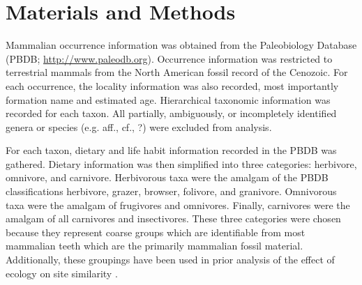 \documentclass[12pt,letterpaper]{article}
\begin{document}
%
%


\section{Materials and Methods}
Mammalian occurrence information was obtained from the Paleobiology Database (PBDB; \url{http://www.paleodb.org}). Occurrence information was restricted to terrestrial mammals from the North American fossil record of the Cenozoic. For each occurrence, the locality information was also recorded, most importantly formation name and estimated age. Hierarchical taxonomic information was recorded for each taxon. All partially, ambiguously, or incompletely identified genera or species (e.g. aff., cf., ?) were excluded from analysis. 


For each taxon, dietary and life habit information recorded in the PBDB was gathered. Dietary information was then simplified into three categories: herbivore, omnivore, and carnivore. Herbivorous taxa were the amalgam of the PBDB classifications herbivore, grazer, browser, folivore, and granivore. Omnivorous taxa were the amalgam of frugivores and omnivores. Finally, carnivores were the amalgam of all carnivores and insectivores. These three categories were chosen because they represent coarse groups which are identifiable from most mammalian teeth which are the primarily mammalian fossil material. Additionally, these groupings have been used in prior analysis of the effect of ecology on site similarity \citep{Jernvall2004}.
\end{document}
